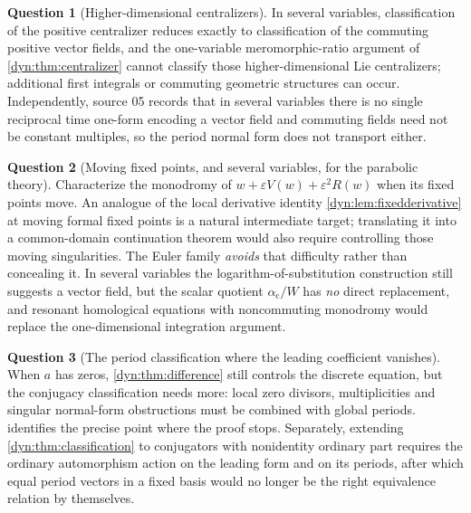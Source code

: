 \documentclass[11pt,letterpaper]{article}
\theoremstyle{definition}
\newtheorem{question}[question]{Question}
\theoremstyle{remark}
\newcommand{\eps}{\varepsilon}
\numberwithin{equation}{section}
\begin{document}
\begin{question}[Higher-dimensional centralizers]\label{dyn:q:centralizers}
In several variables, classification of the positive centralizer reduces
exactly to classification of the commuting positive vector fields, and the
one-variable meromorphic-ratio argument of \cref{dyn:thm:centralizer}
cannot classify those higher-dimensional Lie centralizers; additional first
integrals or commuting geometric structures can occur. Independently,
source 05 records that in several variables there is no single reciprocal
time one-form encoding a vector field and commuting fields need not be
constant multiples, so the period normal form does not transport either.
\end{question}

\begin{question}[Moving fixed points, and several variables, for the
parabolic theory]\label{dyn:q:moving}
Characterize the monodromy of $w+\eps V(w)+\eps^{2}R(w)$ when its fixed
points move. An analogue of the local derivative identity
\cref{dyn:lem:fixedderivative} at moving formal fixed points is a natural
intermediate target; translating it into a common-domain continuation
theorem would also require controlling those moving singularities. The
Euler family \emph{avoids} that difficulty rather than concealing it. In
several variables the logarithm-of-substitution construction still suggests
a vector field, but the scalar quotient $\alpha_{\mathrm c}/W$ has
\emph{no} direct replacement, and resonant homological equations with
noncommuting monodromy would replace the one-dimensional integration
argument.
\end{question}

\begin{question}[The period classification where the leading coefficient
vanishes]\label{dyn:q:zeros}
When $a$ has zeros, \cref{dyn:thm:difference} still controls the discrete
equation, but the conjugacy classification needs more: local zero divisors,
multiplicities and singular normal-form obstructions must be combined with
global periods.  identifies the precise point
where the proof stops. Separately, extending
\cref{dyn:thm:classification} to conjugators with nonidentity ordinary part
requires the ordinary automorphism action on the leading form and on its
periods, after which equal period vectors in a fixed basis would no longer
be the right equivalence relation by themselves.
\end{question}
\end{document}
